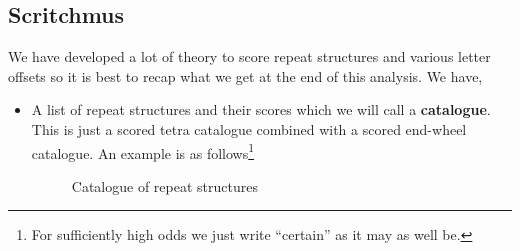 \subsection{Scritchmus}
We have developed a lot of theory to score repeat structures and
various letter offsets so it is best to recap what we get at the
end of this analysis. We have,
\begin{itemize}
  \item A list of repeat structures and their scores which we will
    call a {\bf{catalogue}}. This is just a scored tetra catalogue
    combined with a scored end-wheel catalogue. An example is as
    follows\footnote{For sufficiently high odds we just write
    ``certain'' as it may as well be.}
    \begin{figure}[H]

      \begin{center}
      \end{center}
      \caption{Catalogue of repeat structures}
      \label{fig:catalogue}
    \end{figure}

\end{itemize}
